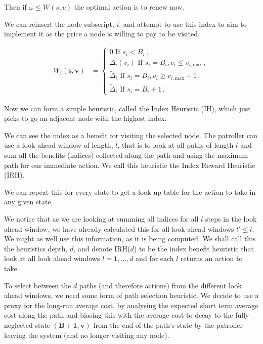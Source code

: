 \documentclass[a4paper,10pt]{article}
\theoremstyle{definition}
\theoremstyle{definition}
\theoremstyle{remark}
\theoremstyle{definition}
\begin{document}
Then if $\omega \leq W(s,v)$ the optimal action is to renew now.

We can reinsert the node subscript, $i$, and attempt to use this index to aim to implement it as the price a node is willing to pay to be visited.

\begin{align*}
W_{i}(\bm{s},\bm{v})&=\begin{cases}
0 \text{ If } s_{i}<B_{i} \, , \\
\Delta_{i}(v_{i}) \text{ If } s_{i}=B_{i} , v_{i} \leq v_{i,\text{max}} \, , \\
\widetilde{\Delta}_{i} \text{ If } s_{i}=B_{i} , v_{i} \geq v_{i,\text{max}}+1 \, , \\
\widetilde{\Delta}_{i} \text{ If } s_{i}=B_{i}+1 \, .
\end{cases}
\end{align*}

Now we can form a simple heuristic, called the Index Heuristic (IH), which just picks to go an adjacent node with the highest index.

We can see the index as a benefit for visiting the selected node. The patroller can use a look-ahead window of length, $l$, that is to look at all paths of length $l$ and sum all the benefits (indices) collected along the path and using the maximum path for our immediate action. We call this heuristic the Index Reward Heuristic (IRH).

We can repeat this for every state to get a look-up table for the action to take in any given state.

We notice that as we are looking at summing all indices for all $l$ steps in the look ahead window, we have already calculated this for all look ahead windows $l' \leq l$. We might as well use this information, as it is being computed. We shall call this the heuristics depth, $d$, and denote IRH($d$) to be the index benefit heuristic that look at all look ahead windows $l=1,...,d$ and for each $l$ returns an action to take.

To select between the $d$ paths (and therefore actions) from the different look ahead windows, we need some form of path selection heuristic. We decide to use a proxy for the long-run average cost, by analysing the expected short term average cost along the path and biasing this with the average cost to decay to the fully neglected state $(\bm{B}+\bm{1},\bm{v})$ from the end of the path's state by the patroller leaving the system (and no longer visiting any node).
\end{document}
